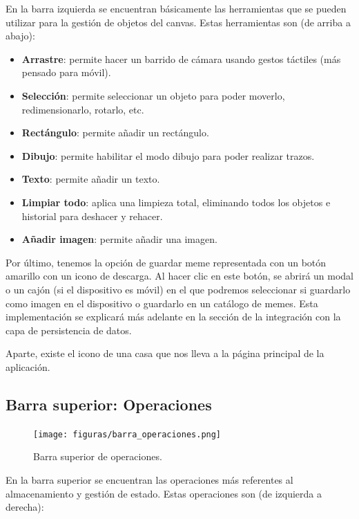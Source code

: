 En la barra izquierda se encuentran básicamente las herramientas que se pueden utilizar para la gestión de objetos del canvas. Estas herramientas son (de arriba a abajo):

\begin{itemize}
    \item \textbf{Arrastre}: permite hacer un barrido de cámara usando gestos táctiles (más pensado para móvil).
    \item \textbf{Selección}: permite seleccionar un objeto para poder moverlo, redimensionarlo, rotarlo, etc.
    \item \textbf{Rectángulo}: permite añadir un rectángulo.
    \item \textbf{Dibujo}: permite habilitar el modo dibujo para poder realizar trazos.
    \item \textbf{Texto}: permite añadir un texto.
    \item \textbf{Limpiar todo}: aplica una limpieza total, eliminando todos los objetos e historial para deshacer y rehacer.
    \item \textbf{Añadir imagen}: permite añadir una imagen.
\end{itemize}

Por último, tenemos la opción de guardar meme representada con un botón amarillo con un icono de descarga. Al hacer clic en este botón, se abrirá un modal o un cajón (si el dispositivo es móvil) en el que podremos seleccionar si guardarlo como imagen en el dispositivo o guardarlo en un catálogo de memes. Esta implementación se explicará más adelante en la sección de la integración con la capa de persistencia de datos.

Aparte, existe el icono de una casa que nos lleva a la página principal de la aplicación.

\subsection{Barra superior: Operaciones}

\begin{figure}[H]
    \caption{Barra superior de operaciones.}
    \centering
    \vspace*{0.5cm}
    \texttt{[image: figuras/barra\_operaciones.png]}
\end{figure}

En la barra superior se encuentran las operaciones más referentes al almacenamiento y gestión de estado. Estas operaciones son (de izquierda a derecha):

